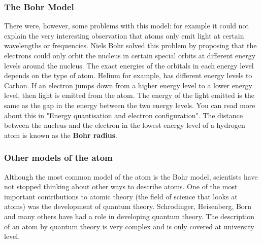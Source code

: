             \subsubsection{ The Bohr Model}
            \nopagebreak
        \label{m38756*id254784}There were, however, some problems with this model: for example it could not explain the very interesting
observation that atoms only emit light at certain wavelengths or frequencies. Niels Bohr solved
this problem by proposing that the electrons could only orbit the nucleus in certain special orbits
at different energy levels around the nucleus. The exact energies of the orbitals in each energy level depends on
the type of atom. Helium for example, has different energy levels to Carbon. If an electron jumps down
from a higher energy level to a lower energy level, then light is emitted from
the atom. The energy of the light emitted is the same as the gap in the energy between the two
energy levels. You can read more about this in "Energy quantisation and electron configuration". The distance between the nucleus and the electron in the lowest energy level of a hydrogen atom is known as the \textbf{Bohr radius}.\par 
\label{m38756*notfhsst!!!underscore!!!id119}

      

\label{m38756*eip-279}
            \subsubsection{ Other models of the atom}
            \nopagebreak
            \label{m38756*eip-993}
Although the most common model of the atom is the Bohr model, scientists have not stopped thinking about other ways to describe atoms. One of the most important contributions to atomic theory (the field of science that looks at atoms) was the development of quantum theory. Schrodinger, Heisenberg, Born and many others have had a role in developing quantum theory. The description of an atom by quantum theory is very complex and is only covered at university level.  
\par \label{m38756*eip-179}
